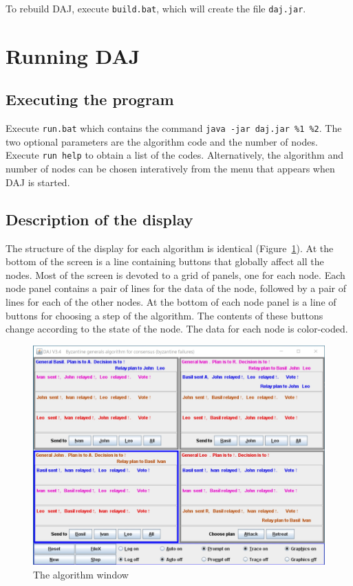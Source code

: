 \documentclass[11pt]{article}
\newcommand{\daj}{\textsc{DAJ}}
\newcommand{\p}[1]{\texttt{#1}}
\begin{document}
To rebuild \daj{}, execute \p{build.bat}, which will create the
file \p{daj.jar}.

\section{Running \daj{}}\label{s.run}

\subsection{Executing the program}

Execute \p{run.bat} which contains the command \p{java -jar daj.jar \%1 \%2}.
The two optional parameters are the algorithm code and the number of nodes. Execute \p{run help} to obtain a list of the codes. Alternatively, the algorithm and number of nodes can be chosen interatively from the menu that appears when \daj{} is started.

\subsection{Description of the display}
The structure of the display for each algorithm is identical (Figure~\ref{fig1}).
At the bottom of the screen is a line containing buttons that globally affect
all the nodes.
Most of the screen is devoted to a grid of panels, one for each node.
Each node panel contains a pair of lines for the data of the node, followed
by a pair of lines for each of the other nodes.
At the bottom of each node panel is a line of buttons for choosing a step
of the algorithm. The contents of these buttons change according to the
state of the node.
The data for each node is color-coded.

\begin{figure}[t]
\begin{center}
\includegraphics[width=15cm,keepaspectratio=true]{daj.jpg}
\end{center}
\caption{The algorithm window}\label{fig1}
\end{figure}
\end{document}
